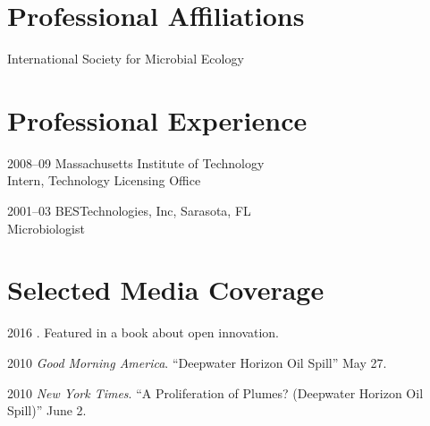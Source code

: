 \documentclass[12pt,letterpaper]{report}
\newcommand{\listitemspace}{0.15em}
\renewenvironment{itemize}
{\begin{list}{}{\setlength{\leftmargin}{0em}
            \setlength{\parskip}{0em}
            \setlength{\itemsep}{\listitemspace}
            \setlength{\parsep}{\listitemspace}}}
    {\end{list}}
\begin{document}
    \section*{Professional Affiliations}

    \begin{itemize}

        \item International Society for Microbial Ecology

    \end{itemize}



    \section*{Professional Experience}

    \begin{tablist}

        \item[2008--09] \tab Massachusetts Institute of Technology \\
        			    Intern, Technology Licensing Office
			    
	\item[2001--03] \tab BESTechnologies, Inc, Sarasota, FL \\
				Microbiologist	

    \end{tablist}



    \section*{Selected Media Coverage}

    \begin{tablist}
    
    	\item[2016] \tab {}. Featured in a book about open innovation.
        \item[2010] \tab \textit{Good Morning America}.  \enquote{Deepwater Horizon Oil Spill}  May 27.

        \item[2010] \tab \textit{New York Times}. \enquote{A Proliferation of Plumes? (Deepwater Horizon Oil Spill)}  June 2.
        


    \end{tablist}
\end{document}
